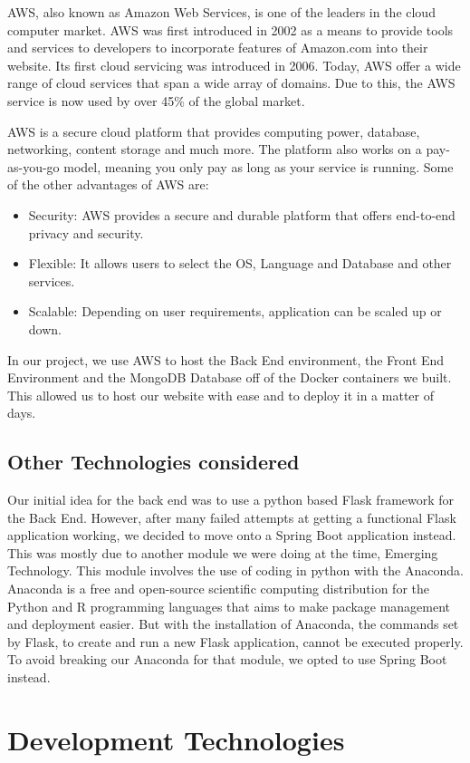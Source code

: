 AWS, also known as Amazon Web Services, is one of the leaders in the cloud computer market. AWS was first introduced in 2002 as a means to provide tools and services to developers to incorporate features of Amazon.com into their website. Its first cloud servicing was introduced in 2006. Today, AWS offer a wide range of cloud services that span a wide array of domains. Due to this, the AWS service is now used by over 45\% of the global market. \par
AWS is a secure cloud platform that provides computing power, database, networking, content storage and much more. The platform also works on a pay-as-you-go model, meaning you only pay as long as your service is running. Some of the other advantages of AWS are:
\begin{itemize}
    \item Security: AWS provides a secure and durable platform that offers end-to-end privacy and security.
    \item Flexible: It allows users to select the OS, Language and Database and other services.
    \item Scalable: Depending on user requirements, application can be scaled up or down.
\end{itemize}
In our project, we use AWS to host the Back End environment, the Front End Environment and the MongoDB Database off of the Docker containers we built. This allowed us to host our website with ease and to deploy it in a matter of days.

\subsection{Other Technologies considered}
Our initial idea for the back end was to use a python based Flask framework for the Back End. However, after many failed attempts at getting a functional Flask application working, we decided to move onto a Spring Boot application instead. This was mostly due to another module we were doing at the time, Emerging Technology. This module involves the use of coding in python with the Anaconda. Anaconda is a free and open-source scientific computing distribution for the Python and R programming languages that aims to make package management and deployment easier. But with the installation of Anaconda, the commands set by Flask, to create and run a new Flask application, cannot be executed properly. To avoid breaking our Anaconda for that module, we opted to use Spring Boot instead. 

\section{Development Technologies}

